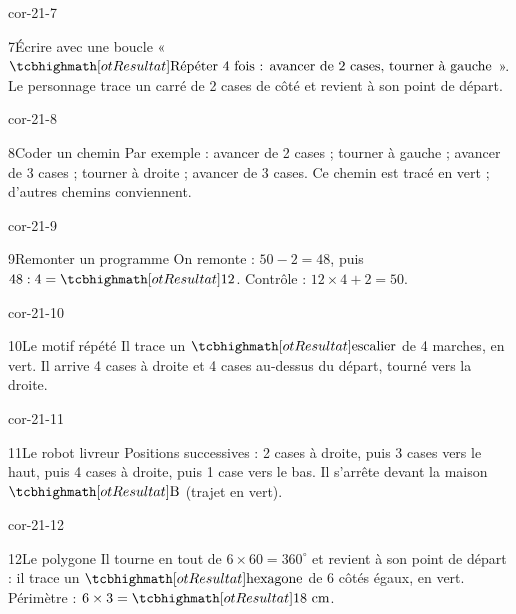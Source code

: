 \begin{blocLivre}{cor-21-7}\begin{corrige}{7}{Écrire avec une boucle}
« $\res{\text{Répéter 4 fois : avancer de 2 cases, tourner à gauche}}$ ». Le personnage trace un carré de 2 cases de côté et revient à son point de départ.
\end{corrige}\end{blocLivre}
\begin{blocLivre}{cor-21-8}\begin{corrige}{8}{Coder un chemin}
Par exemple : avancer de 2 cases ; tourner à gauche ; avancer de 3 cases ; tourner à droite ; avancer de 3 cases. Ce chemin est tracé en vert ; d’autres chemins conviennent.
\label{fig-cor-21-8}
\end{corrige}\end{blocLivre}
\begin{blocLivre}{cor-21-9}\begin{corrige}{9}{Remonter un programme}
On remonte : $50-2=48$, puis $48:4=\res{12}$. Contrôle : $12\times4+2=50$.
\end{corrige}\end{blocLivre}
\begin{blocLivre}{cor-21-10}\begin{corrige}{10}{Le motif répété}
Il trace un $\res{\text{escalier}}$ de 4 marches, en vert. Il arrive 4 cases à droite et 4 cases au-dessus du départ, tourné vers la droite.
\label{fig-cor-21-10}
\end{corrige}\end{blocLivre}
\begin{blocLivre}{cor-21-11}\begin{corrige}{11}{Le robot livreur}
Positions successives : 2 cases à droite, puis 3 cases vers le haut, puis 4 cases à droite, puis 1 case vers le bas. Il s’arrête devant la maison $\res{\text{B}}$ (trajet en vert).
\label{fig-cor-21-11}
\end{corrige}\end{blocLivre}
\begin{blocLivre}{cor-21-12}\begin{corrige}{12}{Le polygone}
Il tourne en tout de $6\times60=360^\circ$ et revient à son point de départ : il trace un $\res{\text{hexagone}}$ de 6 côtés égaux, en vert. Périmètre : $6\times3=\res{18\ \mathrm{cm}}$.
\label{fig-cor-21-12}
\end{corrige}\end{blocLivre}
